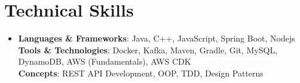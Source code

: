 \section{Technical Skills}
\begin{itemize}[leftmargin=0.15in, label={}]
    \item{
        \textbf{Languages \& Frameworks}{: Java, C++, JavaScript, Spring Boot, Nodejs} \\[0.5ex]
        \textbf{Tools \& Technologies}{: Docker, Kafka, Maven, Gradle, Git, MySQL, DynamoDB, AWS (Fundamentals), AWS CDK} \\[0.5ex]
        \textbf{Concepts}{: REST API Development, OOP, TDD, Design Patterns}
    }
\end{itemize}

